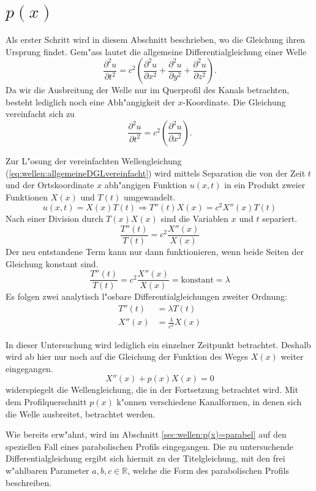 \section{\texorpdfstring{$p(x)$}{p(x)}}
Als erster Schritt wird in diesem Abschnitt beschrieben, wo die Gleichung ihren 
Ursprung findet. Gem"ass \cite{wellen:smirnow2} lautet die allgemeine 
Differentialgleichung einer Welle
\begin{equation*}
	\frac{\partial^2 u}{\partial t^2}
	=
	c^2
	\left(
		\frac{\partial^2 u}{\partial x^2} 
		+ \frac{\partial^2 u}{\partial y^2} 
		+ \frac{\partial^2 u}{\partial z^2}
	\right).
	\label{eq:wellen:allgemeineDGL}
\end{equation*}
Da wir die Ausbreitung der Welle nur im Querprofil des Kanals betrachten, 
besteht lediglich noch eine Abh"angigkeit der $x$-Koordinate. Die Gleichung 
vereinfacht sich zu
\begin{equation}
	\frac{\partial^2 u}{\partial t^2}
	=
	c^2
	\left(
		\frac{\partial^2 u}{\partial x^2} 
	\right).
	\label{eq:wellen:allgemeineDGLvereinfacht}
\end{equation}

Zur L"osung der vereinfachten Wellengleichung 
(\ref{eq:wellen:allgemeineDGLvereinfacht}) wird mittels Separation die von der 
Zeit $t$ und der Ortskoordinate $x$ abh"angigen Funktion $u(x,t)$ in ein 
Produkt zweier Funktionen $X(x)$ und $T(t)$ umgewandelt.
\begin{equation*}
	u (x,t) = X(x) T(t)
	\Rightarrow T''(t) X(x) = c^2 X''(x)T(t)
\end{equation*}
Nach einer Division durch $T(x)X(x)$ sind die Variablen $x$ und $t$ separiert.
\begin{equation*}
	\frac{T''(t)}{T(t)}
	=
	c^2 \frac{X''(x)}{X(x)}
\end{equation*}
Der neu entstandene Term kann nur dann funktionieren, wenn beide Seiten der 
Gleichung konstant sind.
\begin{equation*}
	\frac{T''(t)}{T(t)}
	=
	c^2 \frac{X''(x)}{X(x)} = \text{konstant} = \lambda
\end{equation*}
Es folgen zwei analytisch l"osbare Differentialgleichungen zweiter Ordnung:
\begin{align*}
	T''(t) &= \lambda T(t) \\
	X''(x) &= \frac{\lambda}{c^2}X(x)
\end{align*}

In dieser Untersuchung wird lediglich ein einzelner Zeitpunkt betrachtet.
Deshalb wird ab hier nur noch auf die Gleichung der Funktion des Weges $X(x)$
weiter eingegangen.
\begin{equation*}
	X''(x) + p(x) X(x) = 0
\end{equation*}
widerspiegelt die Wellengleichung, die in der Fortsetzung betrachtet wird. Mit 
dem Profilquerschnitt $p(x)$ k"onnen verschiedene Kanalformen, in denen 
sich die Welle ausbreitet, betrachtet werden.

Wie bereits erw"ahnt, wird im Abschnitt \ref{sec:wellen:p(x)=parabel} auf den 
speziellen Fall eines parabolischen Profils eingegangen. Die zu untersuchende 
Differentialgleichung ergibt sich hiermit zu der Titelgleichung, mit den frei 
w"ahlbaren Parameter ${a,b,c} \in \mathbb{R}$, welche die Form des 
parabolischen Profils beschreiben.